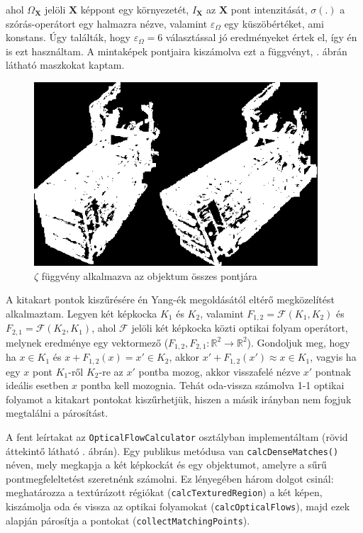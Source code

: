 ahol $\Omega_\mathbf{X}$ jelöli $\mathbf{X}$ képpont egy környezetét, $I_\mathbf{X}$ az $\mathbf{X}$ pont intenzitását, $\sigma(.)$ a szórás-operátort egy halmazra nézve, valamint $\varepsilon_\Omega$ egy küszöbértéket, ami konstans. Úgy találták, hogy $\varepsilon_\Omega = 6$ választással jó eredményeket értek el, így én is ezt használtam. A mintaképek pontjaira kiszámolva ezt a függvényt, . ábrán látható maszkokat kaptam.

\begin{figure}[tbh]
\centering
\includegraphics[width=300pt]{figures/textures.png}
\caption{$\zeta$ függvény alkalmazva az objektum összes pontjára \label{fig:textures}}
\end{figure}

A kitakart pontok kiszűrésére én Yang-ék megoldásától \cite{optical-flow-rectification} eltérő megközelítést alkalmaztam. Legyen két képkocka $K_1$ és $K_2$, valamint $F_{1, 2} = \mathcal{F}(K_1, K_2)$ és $F_{2, 1} = \mathcal{F}(K_2, K_1)$, ahol $\mathcal{F}$ jelöli két képkocka közti optikai folyam operátort, melynek eredménye egy vektormező ($F_{1, 2}, F_{2, 1} : \mathbb{R}^2 \rightarrow \mathbb{R}^2$). Gondoljuk meg, hogy ha $x\in K_1$ és $x + F_{1,2}(x) = x' \in K_2$, akkor $x' + F_{1,2}(x') \approx x \in K_1$, vagyis ha egy $x$ pont $K_1$-ről $K_2$-re az $x'$ pontba mozog, akkor visszafelé nézve $x'$ pontnak ideális esetben $x$ pontba kell mozognia. Tehát oda-vissza számolva 1-1 optikai folyamot a kitakart pontokat kiszűrhetjük, hiszen a másik irányban nem fogjuk megtalálni a párosítást.

A fent leírtakat az \texttt{OpticalFlowCalculator} osztályban implementáltam (rövid áttekintő látható . ábrán). Egy publikus metódusa van \texttt{calcDenseMatches()} néven, mely megkapja a két képkockát és egy objektumot, amelyre a sűrű pontmegfeleltetést szeretnénk számolni. Ez lényegében három dolgot csinál: meghatározza a textúrázott régiókat (\texttt{calcTexturedRegion}) a két képen, kiszámolja oda és vissza az optikai folyamokat (\texttt{calcOpticalFlows}), majd ezek alapján párosítja a pontokat (\texttt{collectMatchingPoints}).

